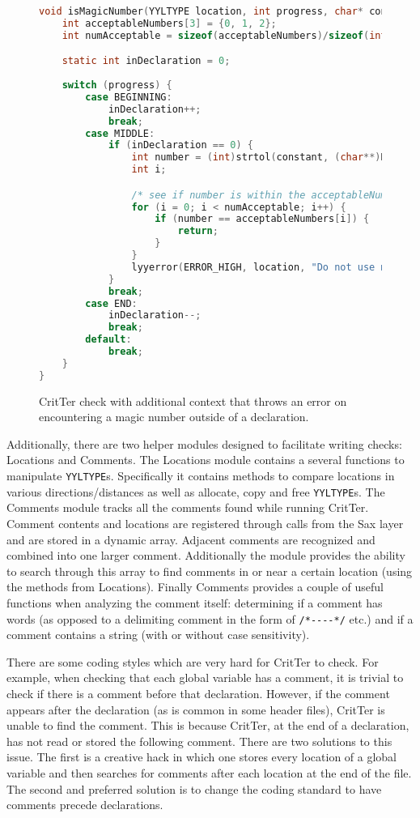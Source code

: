 \documentclass[12pt]{report}
\newcommand{\programName}{CritTer\xspace}
\begin{document}
\begin{figure}
\begin{lstlisting}[language=C]
void isMagicNumber(YYLTYPE location, int progress, char* constant) {
	int acceptableNumbers[3] = {0, 1, 2};
	int numAcceptable = sizeof(acceptableNumbers)/sizeof(int);

	static int inDeclaration = 0;
	
	switch (progress) {
		case BEGINNING:
			inDeclaration++;
			break;
		case MIDDLE:
			if (inDeclaration == 0) {
				int number = (int)strtol(constant, (char**)NULL, 0);
				int i;

				/* see if number is within the acceptableNumbers array */
				for (i = 0; i < numAcceptable; i++) {
					if (number == acceptableNumbers[i]) {
						return;
					}
				}
				lyyerror(ERROR_HIGH, location, "Do not use magic numbers");
			}
			break;
		case END:
			inDeclaration--;
			break;
		default:
			break;
	}
}
\end{lstlisting}
\caption[\programName Check with Additional Context]{\programName check with additional context that throws an error on encountering a magic number outside of a declaration.}
\label{checkWithContext}
\end{figure}

Additionally, there are two helper modules designed to facilitate writing checks: Locations and 
Comments. The Locations module contains a several functions to manipulate \lstinline{YYLTYPE}s.  
Specifically it contains methods to compare locations in various directions\slash distances as well as 
allocate, copy and free \lstinline{YYLTYPE}s. The Comments module tracks all the comments found 
while running \programName. Comment contents and locations are registered through calls from the 
Sax layer and are stored in a dynamic array. Adjacent comments are recognized and combined into one 
larger comment. Additionally the module provides the ability to search through this array to find 
comments in or near a certain location (using the methods from Locations). Finally Comments provides a 
couple of useful functions when analyzing the comment itself: determining if a comment has words (as 
opposed to a delimiting comment in the form of \lstinline{/*----*/} etc.) and if a comment contains a string 
(with or without case sensitivity).

There are some coding styles which are very hard for \programName to check. For example, when 
checking that each global variable has a comment, it is trivial to check if there is a comment before that 
declaration. However, if the comment appears after the declaration (as is common in some header 
files), \programName is unable to find the comment. This is because \programName, at the end of a 
declaration, has not read or stored the following comment. There are two solutions to this issue. The 
first is a creative hack in which one stores every location of a global variable and then searches for 
comments after each location at the end of the file. The second and preferred solution is to change the 
coding standard to have comments precede declarations.
\end{document}
